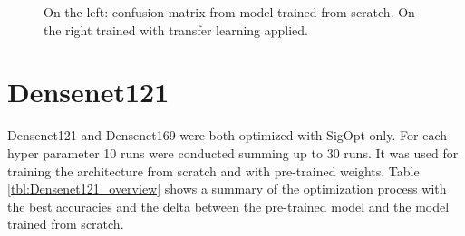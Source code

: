 \begin{figure}[h]
\centering
\caption{On the left: confusion matrix from model trained from scratch. On the right trained with transfer learning applied.}
\label{fig:resnet18-cm}
\end{figure}














\section{Densenet121}

Densenet121 and Densenet169 were both optimized with SigOpt only. For each hyper parameter 10 runs were conducted summing up to 30 runs. It was used for training the architecture from scratch and with pre-trained weights. Table \ref{tbl:Densenet121_overview} shows a summary of the optimization process with the best accuracies and the delta between the pre-trained model and the model trained from scratch.

